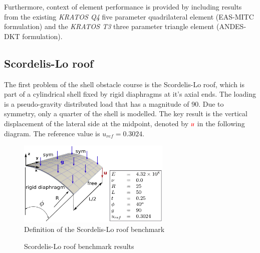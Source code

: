 Furthermore, context of element performance is provided by including results from the existing \textit{KRATOS Q4} five parameter quadrilateral element (EAS-MITC formulation) and the \textit{KRATOS T3} three parameter triangle element (ANDES-DKT formulation).
\newpage
\subsection{Scordelis-Lo roof}
%

The first problem of the shell obstacle course is the Scordelis-Lo roof, which is part of a cylindrical shell fixed by rigid diaphragms at it's axial ends. The loading is a pseudo-gravity distributed load that has a magnitude of 90. Due to symmetry, only a quarter of the shell is modelled. The key result is the vertical displacement of the lateral side at the midpoint, denoted by $\textcolor{red}{u}$ in the following diagram. The reference value is $u_{ref} = 0.3024$.
 
  \begin{figure}[H]
 	\centering
 	\def\svgwidth{\columnwidth}
 	\includegraphics[width=7.3cm]{images/scordelisroof.png}
 	\caption{Definition of the Scordelis-Lo roof benchmark\cite{Bou13}}
 \end{figure}
 
\begin{figure}[H]
	\caption{\label{ref_label_overall}Scordelis-Lo roof benchmark results}
\end{figure}

